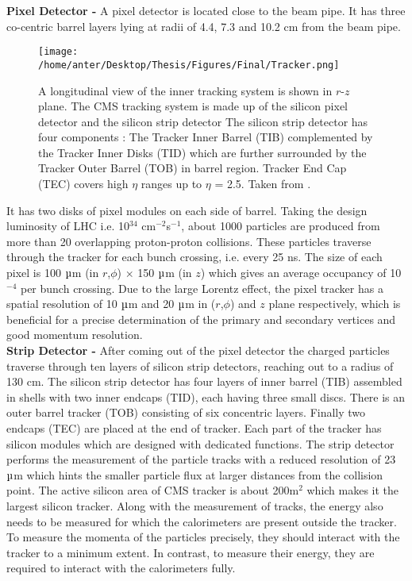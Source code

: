 {\bf Pixel Detector -} A pixel detector is located close to the beam pipe. It has three co-centric barrel layers lying at radii of 4.4, 7.3 and 10.2 cm from the beam pipe. \begin{figure}[h]
\begin{center} 
\vspace*{2mm}
\hspace*{-6mm}
\texttt{[image: /home/anter/Desktop/Thesis/Figures/Final/Tracker.png]}
\caption[A longitudinal view of the inner tracking system is shown in $r$-$z$ plane.]{A longitudinal view of the inner tracking system is shown in $r$-$z$ plane. The CMS tracking system is made up of the silicon pixel detector and the silicon strip detector  The silicon strip detector has four components : The Tracker Inner Barrel (TIB) complemented by the Tracker Inner Disks (TID) which are further surrounded by the Tracker Outer Barrel (TOB) in barrel region. Tracker End Cap (TEC) covers high $\eta$ ranges up to $\eta$ = 2.5. Taken from \cite{Chatrchyan:2008aa}.}
\label{fig:tracker}
\end{center}
\end{figure} It has two disks of pixel modules on each side of barrel. Taking the design luminosity of LHC i.e. 10$^{34}$ cm$^{-2}$s$^{-1}$, about 1000 particles are produced from more than 20 overlapping proton-proton collisions. These particles traverse through the tracker for each bunch crossing, i.e. every 25 ns. The size of each pixel is 100 $\micro$m (in $r$,$\phi$) $\times$ 150 $\micro$m (in $z$) which gives an average occupancy of 10$^{-4}$ per bunch crossing. Due to the large Lorentz effect, the pixel tracker has a spatial resolution of 10 $\micro$m and 20 $\micro$m in ($r$,$\phi$) and $z$ plane respectively, which is beneficial for a precise determination of the primary and secondary vertices and good momentum resolution. \\ \newline
{\bf Strip Detector -} After coming out of the pixel detector the charged particles traverse through ten layers of silicon strip detectors, reaching out to a radius of 130 cm. The silicon strip detector has four layers of inner barrel (TIB) assembled in shells with two inner endcaps (TID), each having three small discs. There is an outer barrel tracker (TOB) consisting of six concentric layers. Finally two endcaps (TEC) are placed at the end of tracker. Each part of the tracker has silicon modules which are designed with dedicated functions. The strip detector performs the measurement of the particle tracks with a reduced resolution of 23 $\micro$m which hints the smaller particle flux at larger distances from the collision point.
The active silicon area of CMS tracker is about 200m$^{2}$ which makes it the largest silicon tracker. Along with the measurement of tracks, the energy also needs to be measured for which the calorimeters are present outside the tracker. To measure the momenta of the particles precisely, they should interact with the tracker to a minimum extent. In contrast, to measure their energy, they are required to interact with the calorimeters fully.

